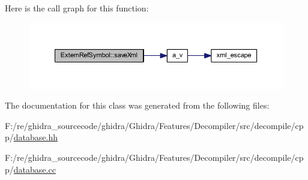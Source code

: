 Here is the call graph for this function\+:
\nopagebreak
\begin{figure}[H]
\begin{center}
\leavevmode
\includegraphics[width=350pt]{class_extern_ref_symbol_aaff9d3efb4a2594f857799db35eddc1d_cgraph}
\end{center}
\end{figure}


The documentation for this class was generated from the following files\+:\begin{DoxyCompactItemize}
\item 
F\+:/re/ghidra\+\_\+sourcecode/ghidra/\+Ghidra/\+Features/\+Decompiler/src/decompile/cpp/\mbox{\hyperlink{database_8hh}{database.\+hh}}\item 
F\+:/re/ghidra\+\_\+sourcecode/ghidra/\+Ghidra/\+Features/\+Decompiler/src/decompile/cpp/\mbox{\hyperlink{database_8cc}{database.\+cc}}\end{DoxyCompactItemize}
